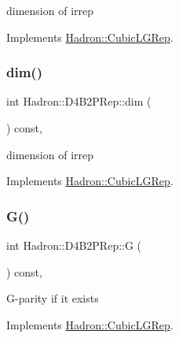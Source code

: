 dimension of irrep 

Implements \mbox{\hyperlink{structHadron_1_1CubicLGRep_a3acbaea26503ed64f20df693a48e4cdd}{Hadron\+::\+Cubic\+L\+G\+Rep}}.

\mbox{\label{structHadron_1_1D4B2PRep_a7618d0e6ba704200dac6e55ca799a815}} 
\subsubsection{\texorpdfstring{dim()}{dim()}\hspace{0.1cm}{\footnotesize\ttfamily [3/3]}}
{\footnotesize\ttfamily int Hadron\+::\+D4\+B2\+P\+Rep\+::dim (\begin{DoxyParamCaption}{ }\end{DoxyParamCaption}) const\hspace{0.3cm}{\ttfamily [inline]}, {\ttfamily [virtual]}}

dimension of irrep 

Implements \mbox{\hyperlink{structHadron_1_1CubicLGRep_a3acbaea26503ed64f20df693a48e4cdd}{Hadron\+::\+Cubic\+L\+G\+Rep}}.

\mbox{\label{structHadron_1_1D4B2PRep_a7a15814601dae2dfb46e08a9d1ff8900}} 
\subsubsection{\texorpdfstring{G()}{G()}\hspace{0.1cm}{\footnotesize\ttfamily [1/3]}}
{\footnotesize\ttfamily int Hadron\+::\+D4\+B2\+P\+Rep\+::G (\begin{DoxyParamCaption}{ }\end{DoxyParamCaption}) const\hspace{0.3cm}{\ttfamily [inline]}, {\ttfamily [virtual]}}

G-\/parity if it exists 

Implements \mbox{\hyperlink{structHadron_1_1CubicLGRep_ace26f7b2d55e3a668a14cb9026da5231}{Hadron\+::\+Cubic\+L\+G\+Rep}}.

\mbox{\label{structHadron_1_1D4B2PRep_a7a15814601dae2dfb46e08a9d1ff8900}} 
